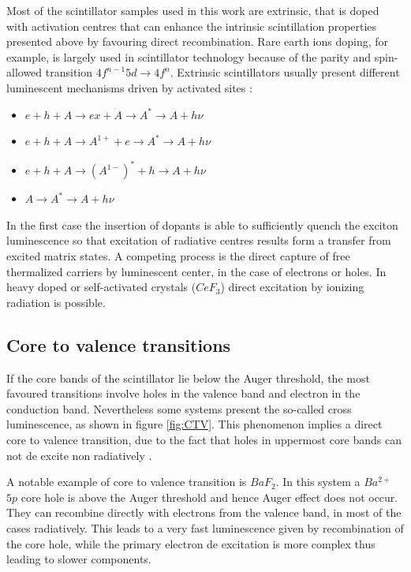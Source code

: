 Most of the scintillator samples used in this work are extrinsic, that is doped with activation centres that can enhance the intrinsic scintillation properties presented above by favouring direct recombination.
Rare earth ions doping, for example, is largely used in scintillator technology because of the parity and spin-allowed transition $4f^{n-1}5d\rightarrow 4f^{n}$. 
Extrinsic scintillators usually present different luminescent mechanisms driven by activated sites \cite{Lecoq2006}:
\begin{itemize}
\item $e + h + A \rightarrow ex + A \rightarrow A^{*} \rightarrow A + h\nu$
\item $e + h + A \rightarrow A^{1+} + e \rightarrow A^{*} \rightarrow A + h\nu$
\item $e + h + A \rightarrow (A^{1-})^{*} + h \rightarrow A + h\nu$
\item $A \rightarrow A^{*} \rightarrow A + h\nu$
\end{itemize}
In the first case the insertion of dopants is able to sufficiently quench the exciton luminescence so that excitation of radiative centres results form a transfer from excited matrix states.
A competing process is the direct capture of free thermalized carriers by luminescent center, in the case of electrons or holes.
In heavy doped or self-activated crystals ($CeF_{3}$) direct excitation by ionizing radiation is possible.


\subsection{Core to valence transitions}

If the core bands of the scintillator lie below the Auger threshold, the most favoured transitions involve holes in the valence band and electron in the conduction band. Nevertheless some systems present the so-called cross luminescence, as shown in figure \ref{fig:CTV}. This phenomenon implies a direct core to valence transition, due to the fact that holes in uppermost core bands can not de excite non radiatively \cite{Lecoq2006}.  

A notable example of core to valence transition is $BaF_{2}$. In this system a $Ba^{2+}$ $5p$ core hole is above the Auger threshold and hence Auger effect does not occur. They can recombine directly with electrons from the valence band, in most of the cases radiatively.
This leads to a very fast luminescence given by recombination of the core hole, while the primary electron de excitation is more complex thus leading to slower components.

